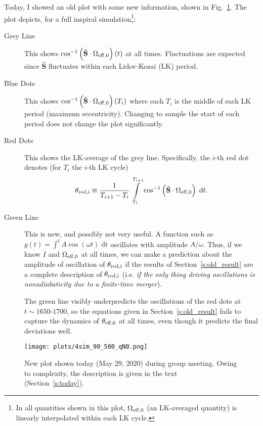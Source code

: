 \documentclass[11pt,
        usenames, %
        dvipsnames %
    ]{article}
\newcommand*{\bm}[1]{\boldsymbol{\mathbf{#1}}}
\newcommand*{\uv}[1]{\hat{\bm{#1}}}
\newcommand*{\p}[1]{\left(#1\right)}
\begin{document}
Today, I showed an old plot with some new information, shown in
Fig.~\ref{fig:newplot}. The plot depicts, for a full inspiral
simulation\footnote{ In all quantities shown in this plot, $\Omega_{\rm eff, 0}$
(an LK-averaged
quantity) is linearly interpolated within each LK cycle.}:
\begin{description}
    \item[Grey Line] This shows $\cos^{-1}\p{\uv{S} \cdot \Omega_{\rm eff, 0}}
        (t)$ at all times. Fluctuations are expected since $\uv{S}$ fluctuates
        within each Lidov-Kozai (LK) period.

    \item[Blue Dots] This shows $\cos^{-1}\p{\uv{S} \cdot \Omega_{\rm eff,
        0}}(T_i)$ where each $T_i$ is the middle of each LK period (maximum
        eccentricity). Changing to sample the start of each period does not
        change the plot significantly.

    \item[Red Dots] This shows the LK-average of the grey line. Specifically,
        the $i$-th red dot denotes (for $T_i$ the $i$-th LK cycle)
        \begin{equation}
            \theta_{\rm red, i} \equiv \frac{1}{T_{i + 1} - T_i}
                \int\limits_{T_i}^{T_{i + 1}}
                    \cos^{-1}\p{\uv{S} \cdot \Omega_{\rm eff, 0}}\;\mathrm{d}t.
        \end{equation}

    \item[Green Line] This is new, and possibly not very useful. A function such
        as $g(t) = \int^t A\cos(\omega t)\;\mathrm{dt}$ oscillates with
        amplitude $A/\omega$. Thus, if we know $\dot{I}$ and $\Omega_{\rm eff,
        0}$ at all times, we can make a prediction about the amplitude of
        oscillation of $\theta_{\rm red,i}$ if the results of
        Section~\ref{s:old_result} are a complete description of $\theta_{\rm
        red, i}$ (i.e. \emph{if the only thing driving
        oscillations is nonadiabaticity due to a finite-time merger}).

        The green line visibly underpredicts the oscillations of the red dots at
        $t \sim 1650$-$1700$, so the equations given in
        Section~\ref{s:old_result} fails to capture the dynamics of $\theta_{\rm
        eff, 0}$ at all times, even though it predicts the final deviations
        well.
\end{description}
\begin{figure}
    \centering
    \texttt{[image: plots/4sim\_90\_500\_qN0.png]}
    \caption{New plot shown today (May 29, 2020) during group meeting. Owing to
    complexity, the description is given in the text (Section~\ref{s:today}).
    }\label{fig:newplot}
\end{figure}
\end{document}
